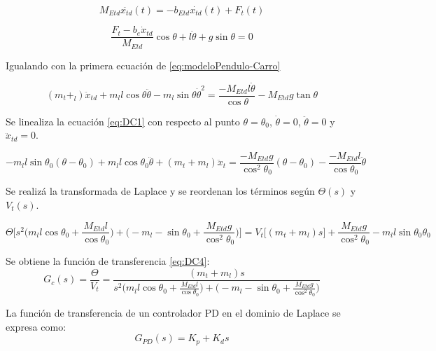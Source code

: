 \documentclass{article}
\begin{document}
        \begin{equation} \label{eq:carrosimp}
            M_{Etd} \ddot{x_{td}}(t) = - b_{Etd} \dot{x_{td}}(t) + F_{t}(t)
        \end{equation}

        \begin{equation}
            \frac{F_t-b_e\dot{x}_{td}}{M_{Etd}}\cos{\theta}+l \ddot{\theta}+ g \sin{\theta}=0
        \end{equation}

        Igualando con la primera ecuación de \ref{eq:modeloPendulo-Carro}

        \begin{equation} \label{eq:DC1}
            (m_t+_l)\ddot{x}_{td}+m_ll\cos{\theta}\ddot{\theta}-m_l\sin{\theta}\dot{\theta}^2=\frac{-M_{Etd}l\ddot{\theta}}{\cos{\theta}}-M_{Etd}g\tan{\theta}
        \end{equation}

        Se linealiza la ecuación \ref{eq:DC1} con respecto al punto \(\theta=\theta_0\), \(\dot{\theta}=0\), \(\ddot{\theta}=0\) y \(\ddot{x}_{td}=0\).

        \begin{equation} \label{eq:DC2}
            -m_ll\sin{\theta_0}(\theta-\theta_0)+m_ll\cos{\theta_0}\ddot{\theta}+(m_t+m_l)\ddot{x}_t=\frac{-M_{Etd}g}{\cos^2{\theta_0}}(\theta-\theta_0)-\frac{-M_{Etd}l}{\cos{\theta_0}}\ddot{\theta}
        \end{equation}

        Se realizá la transformada de Laplace y se reordenan los términos según \(\Theta(s)\) y \(V_t(s)\).

        \begin{equation} \label{eq:DC3}
            \Theta\bigg[s^2\bigg( m_ll\cos{\theta_0}+\frac{M_{Etd}l}{\cos{\theta_0}}\bigg) + \bigg( -m_l-\sin{\theta_0}+\frac{M_{Etd}g}{\cos^2{\theta_0}} \bigg) \bigg]= V_t \bigg[(m_t+m_l)s\bigg]+\frac{M_{Etd}g}{\cos^2{\theta_0}}-m_ll\sin{\theta_0}\theta_0
        \end{equation}

        Se obtiene la función de transferencia \ref{eq:DC4}:
        \begin{equation} \label{eq:DC4}
            G_c(s)=\frac{\Theta}{V_t}=\frac{(m_t+m_l)s}{s^2\bigg( m_ll\cos{\theta_0}+\frac{M_{Etd}l}{\cos{\theta_0}}\bigg) + \bigg( -m_l-\sin{\theta_0}+\frac{M_{Etd}g}{\cos^2{\theta_0}}\bigg) }
        \end{equation}

        La función de transferencia de un controlador PD en el dominio de Laplace se expresa como:
        \begin{equation}
            G_{PD}(s) = K_p + K_d s
        \end{equation}
\end{document}
